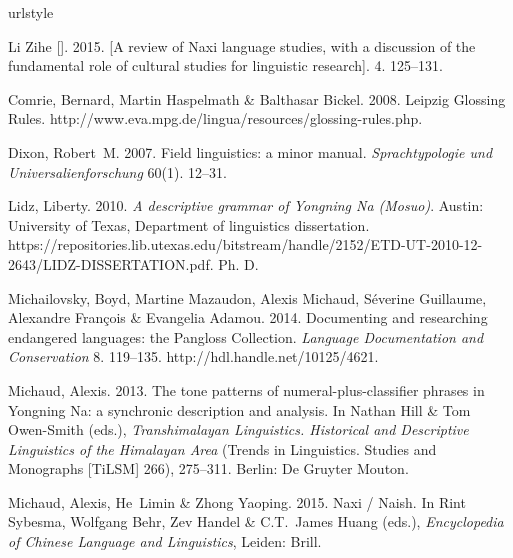 \begin{thebibliography}{7}
	\providecommand{\natexlab}[1]{#1}
	\providecommand{\url}[1]{#1}
	\providecommand{\urlprefix}{}
	\expandafter\ifx\csname urlstyle\endcsname\relax
	\providecommand{\doi}[1]{doi:\discretionary{}{}{}#1}\else
	\providecommand{\doi}{doi:\discretionary{}{}{}\begingroup
		\urlstyle{rm}\Url}\fi
	
	Li Zihe []. 2015.
	\newblock
	[{A} review of {Naxi} language studies, with a discussion of the fundamental
	role of cultural studies for linguistic research].
	\newblock {} 4. 125--131.
	
	Comrie, Bernard, Martin Haspelmath \& Balthasar Bickel. 2008.
	\newblock Leipzig {Glossing Rules}.
	\newblock
	\urlprefix\url{http://www.eva.mpg.de/lingua/resources/glossing-rules.php}.
	
	Dixon, Robert~M. 2007.
	\newblock Field linguistics: a minor manual.
	\newblock \emph{Sprachtypologie und Universalienforschung} 60(1). 12--31.
	
	Lidz, Liberty. 2010.
	\newblock \emph{A descriptive grammar of {Yongning Na} ({Mosuo})}.
	\newblock Austin: University of Texas, Department of linguistics dissertation.
	\newblock
	\urlprefix\url{https://repositories.lib.utexas.edu/bitstream/handle/2152/ETD-UT-2010-12-2643/LIDZ-DISSERTATION.pdf}.
	\newblock Ph. D.
	
	Michailovsky, Boyd, Martine Mazaudon, Alexis Michaud, S{\'{e}}verine Guillaume,
	Alexandre Fran{\c{c}}ois \& Evangelia Adamou. 2014.
	\newblock Documenting and researching endangered languages: the {Pangloss
		Collection}.
	\newblock \emph{Language Documentation and Conservation} 8. 119--135.
	\newblock \urlprefix\url{http://hdl.handle.net/10125/4621}.
	
	Michaud, Alexis. 2013.
	\newblock The tone patterns of numeral-plus-classifier phrases in {Yongning
		Na}: a synchronic description and analysis.
	\newblock In Nathan Hill \& Tom Owen-Smith (eds.), \emph{Transhimalayan
		{Linguistics}. {Historical} and {Descriptive} {Linguistics} of the
		{Himalayan} {Area}} (Trends in {Linguistics}. {Studies} and {Monographs}
	[{TiLSM}] 266), 275--311. Berlin: De Gruyter Mouton.
	
	Michaud, Alexis, He~Limin \& Zhong Yaoping. 2015.
	\newblock Naxi / {Naish}.
	\newblock In Rint Sybesma, Wolfgang Behr, Zev Handel \& C.T.~James Huang
	(eds.), \emph{Encyclopedia of {Chinese} {Language} and {Linguistics}},
	Leiden: Brill.
	
\end{thebibliography}

\cleardoublepage
{}
\setcounter{page}{1}